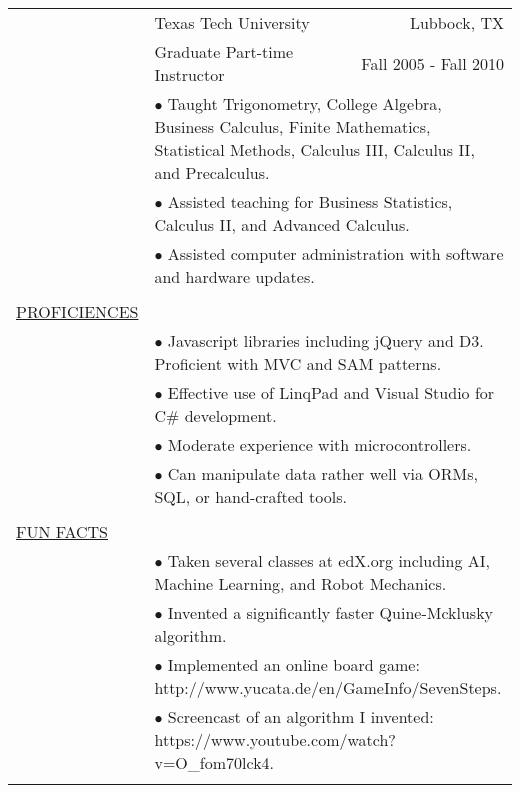 \documentclass[11pt,oneside,letterpaper,titlepage,fleqn]{article}
\begin{document}
\newpage				
\hspace{-1em}\begin{tabular}[h]{@{}p{3.25cm}@{}lr}
						& Texas Tech University & Lubbock, TX\\
						& Graduate Part-time Instructor	 &  Fall 2005 - Fall 2010\\
           & \multicolumn{2}{p{14cm}}{$\bullet$ Taught Trigonometry, College Algebra, Business Calculus, Finite Mathematics, Statistical
Methods, Calculus III, Calculus II, and Precalculus.}\\
           & \multicolumn{2}{p{14cm}}{$\bullet$ Assisted teaching for Business Statistics, Calculus II, and Advanced Calculus.}\\
           & \multicolumn{2}{p{14cm}}{$\bullet$ Assisted computer administration with software and hardware updates.}\\
\\
\underline{PROFICIENCES}\\    
           & \multicolumn{2}{p{14cm}}{$\bullet$ Javascript libraries including jQuery and D3. Proficient with MVC and SAM patterns.}\\
           & \multicolumn{2}{p{14cm}}{$\bullet$ Effective use of LinqPad and Visual Studio for C\# development.}\\
           & \multicolumn{2}{p{14cm}}{$\bullet$ Moderate experience with microcontrollers.}\\					
           & \multicolumn{2}{p{14cm}}{$\bullet$ Can manipulate data rather well via ORMs, SQL, or hand-crafted tools.}\\						
\\
\underline{FUN FACTS}\\
           & \multicolumn{2}{p{14cm}}{$\bullet$ Taken several classes at edX.org including AI, Machine Learning, and Robot Mechanics.}\\
           & \multicolumn{2}{p{14cm}}{$\bullet$ Invented a significantly faster Quine-Mcklusky algorithm.}\\ 					
           & \multicolumn{2}{p{14cm}}{$\bullet$ Implemented an online board game: http://www.yucata.de/en/GameInfo/SevenSteps.}\\
          & \multicolumn{2}{p{14cm}}{$\bullet$ Screencast of an algorithm I invented: https://www.youtube.com/watch?v=O\_fom70lck4.}\\			          
\\					  				
\end{tabular}
\end{document}
